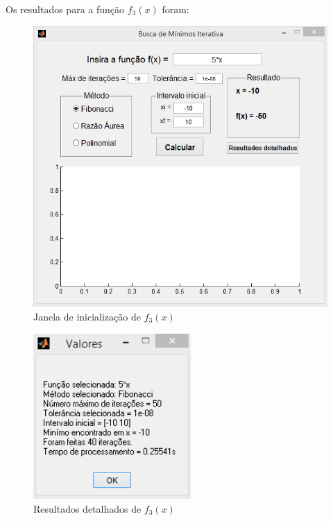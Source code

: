 Os resultados para a função $ f_3(x) $ foram:

\begin{figure}[h]
	\begin{center}
		\includegraphics[width=13cm]{../fibonacci/f3_gui.png}   
		\caption{Janela de inicialização de $ f_3(x) $}
		\label{fig:fibonacci-f3-gui}
	\end{center}
\end{figure}

\begin{figure}[h!]
	\begin{center}
		\includegraphics[width=6cm]{../fibonacci/f3_resultados.png}   
		\caption{Resultados detalhados de $ f_3(x) $}
		\label{fig:fibonacci-f3-resultados}
	\end{center}
\end{figure}

